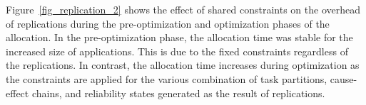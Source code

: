 Figure~\ref{fig_replication_2} shows the effect of shared constraints on the overhead of replications during the pre-optimization and optimization phases of the allocation. In the pre-optimization phase, the allocation time was stable for the increased size of applications. This is due to the fixed constraints regardless of the replications. In contrast, the allocation time increases during optimization as the constraints are applied for the various combination of task partitions, cause-effect chains, and reliability states generated as the result of replications.

